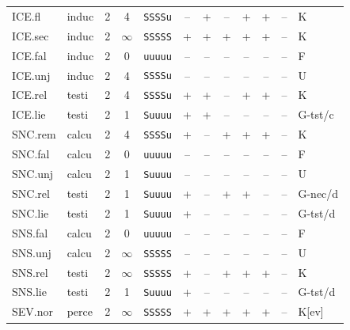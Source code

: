 {\begin{longtable}{@{}llcccccccccl@{}}
ICE.fl & induc & 2 & 4 & \texttt{SSSSu} & \textsf{--} & \textsf{+} & \textsf{--} & \textsf{+} & \textsf{+} & -- & K \\
ICE.sec & induc & 2 & $\infty$ & \texttt{SSSSS} & \textsf{+} & \textsf{+} & \textsf{+} & \textsf{+} & \textsf{+} & -- & K \\
ICE.fal & induc & 2 & 0 & \texttt{uuuuu} & \textsf{--} & \textsf{--} & \textsf{--} & \textsf{--} & \textsf{--} & -- & F \\
ICE.unj & induc & 2 & 4 & \texttt{SSSSu} & \textsf{--} & \textsf{--} & \textsf{--} & \textsf{--} & \textsf{--} & -- & U \\
ICE.rel & testi & 2 & 4 & \texttt{SSSSu} & \textsf{+} & \textsf{+} & \textsf{--} & \textsf{+} & \textsf{+} & -- & K \\
ICE.lie & testi & 2 & 1 & \texttt{Suuuu} & \textsf{+} & \textsf{+} & \textsf{--} & \textsf{--} & \textsf{--} & -- & G-tst/c \\
SNC.rem & calcu & 2 & 4 & \texttt{SSSSu} & \textsf{+} & \textsf{--} & \textsf{+} & \textsf{+} & \textsf{+} & -- & K \\
SNC.fal & calcu & 2 & 0 & \texttt{uuuuu} & \textsf{--} & \textsf{--} & \textsf{--} & \textsf{--} & \textsf{--} & -- & F \\
SNC.unj & calcu & 2 & 1 & \texttt{Suuuu} & \textsf{--} & \textsf{--} & \textsf{--} & \textsf{--} & \textsf{--} & -- & U \\
SNC.rel & testi & 2 & 1 & \texttt{Suuuu} & \textsf{+} & \textsf{--} & \textsf{+} & \textsf{+} & \textsf{--} & -- & G-nec/d \\
SNC.lie & testi & 2 & 1 & \texttt{Suuuu} & \textsf{+} & \textsf{--} & \textsf{--} & \textsf{--} & \textsf{--} & -- & G-tst/d \\
SNS.fal & calcu & 2 & 0 & \texttt{uuuuu} & \textsf{--} & \textsf{--} & \textsf{--} & \textsf{--} & \textsf{--} & -- & F \\
SNS.unj & calcu & 2 & $\infty$ & \texttt{SSSSS} & \textsf{--} & \textsf{--} & \textsf{--} & \textsf{--} & \textsf{--} & -- & U \\
SNS.rel & testi & 2 & $\infty$ & \texttt{SSSSS} & \textsf{+} & \textsf{--} & \textsf{+} & \textsf{+} & \textsf{+} & -- & K \\
SNS.lie & testi & 2 & 1 & \texttt{Suuuu} & \textsf{+} & \textsf{--} & \textsf{--} & \textsf{--} & \textsf{--} & -- & G-tst/d \\
SEV.nor & perce & 2 & $\infty$ & \texttt{SSSSS} & \textsf{+} & \textsf{+} & \textsf{+} & \textsf{+} & \textsf{+} & -- & K[ev] \\

\end{longtable}}
